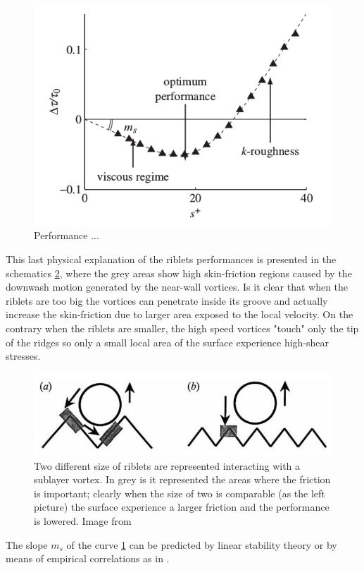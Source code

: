 \begin{figure}[h]
	\centering
	\includegraphics[width=0.5\linewidth]{chapter_1/riblets_performance}
	\caption{Performance ... \citet{jimenez2001turbulent} }
	\label{fig:riblets_perf}
\end{figure}

This last physical explanation of the riblets performances is presented in the schematics \ref{fig:riblets_schem}, where the grey areas show high skin-friction regions caused by the downwash motion generated by the near-wall vortices.
Is it clear that when the riblets are too big the vortices can penetrate inside its groove and actually increase the skin-friction due to larger area exposed to the local velocity.
On the contrary when the riblets are smaller, the high speed vortices "touch" only the tip of the ridges so only a small local area of the surface experience high-shear stresses.

\begin{figure}[h]
	\centering
	\includegraphics[width=0.7\linewidth]{chapter_1/riblets1}
	\caption{Two different size of riblets are represented interacting with a sublayer vortex. In grey is it represented the areas where the friction is important; clearly when the size of two is comparable (as the left picture) the surface experience a larger friction and the performance is lowered. Image from \citet{choi1993direct}}
	\label{fig:riblets_schem}
\end{figure}

The slope $m_s$ of the curve \ref{fig:riblets_perf} can be predicted by linear stability theory or by means of empirical correlations as in \citet{garcia2011hydrodynamic}.

